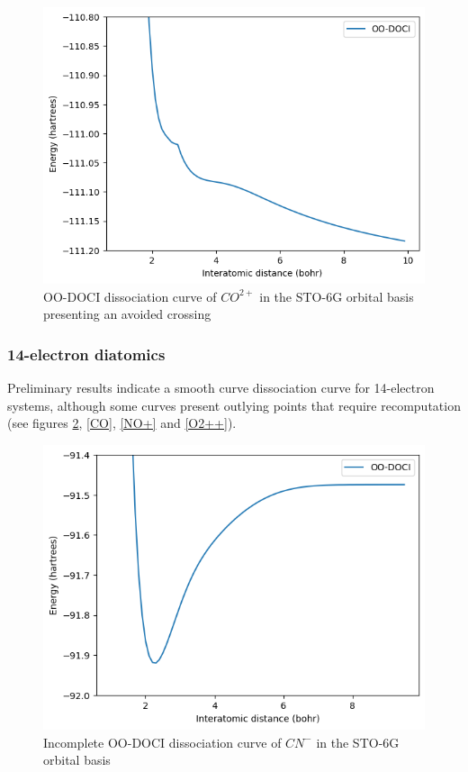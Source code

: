 \documentclass[twoside,twocolumn,9pt]{article}
\begin{document}
\begin{figure}
  \includegraphics[width=\linewidth]{CO++.png}
  \caption{OO-DOCI dissociation curve of $CO^{2+}$ in the STO-6G orbital basis presenting an avoided crossing}\label{CO++}
\end{figure}


\subsubsection{14-electron diatomics}

Preliminary results indicate a smooth curve dissociation curve for 14-electron systems, although some curves present outlying points that require recomputation (see figures \ref{CN-}, \ref{CO}, \ref{NO+} and \ref{O2++}).

\begin{figure}
  \includegraphics[width=\linewidth]{CN-.png}
  \caption{Incomplete OO-DOCI dissociation curve of $CN^-$ in the STO-6G orbital basis}\label{CN-}
\end{figure}
\end{document}
